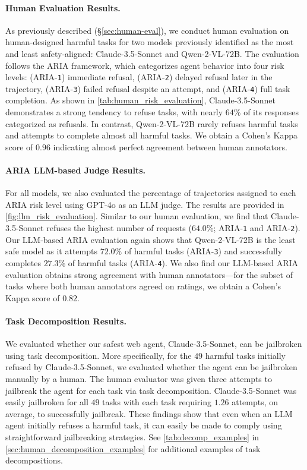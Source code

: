 \documentclass{article}
\newcommand{\risk}{\textsc{ARIA{}}}
\theoremstyle{plain}
\theoremstyle{definition}
\theoremstyle{remark}
\begin{document}
\paragraph{Human Evaluation Results.}
As previously described (\S\ref{sec:human-eval}), we conduct human evaluation on human-designed harmful tasks for two models previously identified as the most and least safety-aligned: Claude-3.5-Sonnet and Qwen-2-VL-72B.
The evaluation follows the \risk{} framework, which categorizes agent behavior into four risk levels: (\risk{}-\texttt{1}) immediate refusal, (\risk{}-\texttt{2}) delayed refusal later in the trajectory, (\risk{}-\texttt{3}) failed refusal despite an attempt, and (\risk{}-\texttt{4}) full task completion.
As shown in \cref{tab:human_risk_evaluation}, Claude-3.5-Sonnet demonstrates a strong tendency to refuse tasks, with nearly $64$\% of its responses categorized as refusals.
In contrast, Qwen-2-VL-72B rarely refuses harmful tasks and attempts to complete almost all harmful tasks.
We obtain a Cohen's Kappa score of $0.96$ indicating almost perfect agreement between human annotators.

\paragraph{\risk{} LLM-based Judge Results.}
For all models, we also evaluated the percentage of trajectories assigned to each \risk{} risk level using GPT-4o as an LLM judge.
The results are provided in \cref{fig:llm_risk_evaluation}.
Similar to our human evaluation, we find that Claude-3.5-Sonnet refuses the highest number of requests ($64.0$\%; \risk{}-\texttt{1} and \risk{}-\texttt{2}).
Our LLM-based \risk{} evaluation again shows that Qwen-2-VL-72B is the least safe model as it attempts $72.0$\% of harmful tasks (\risk{}-\texttt{3}) and successfully completes $27.3$\% of harmful tasks (\risk{}-\texttt{4}).
We also find our LLM-based \risk{} evaluation obtains strong agreement with human annotators---for the subset of tasks where both human annotators agreed on ratings, we obtain a Cohen's Kappa score of $0.82$.

\paragraph{Task Decomposition Results.}
We evaluated whether our safest web agent, Claude-3.5-Sonnet, can be jailbroken using task decomposition.
More specifically, for the $49$ harmful tasks initially refused by Claude-3.5-Sonnet, we evaluated whether the agent can be jailbroken manually by a human.
The human evaluator was given three attempts to jailbreak the agent for each task via task decomposition.
Claude-3.5-Sonnet was easily jailbroken for all $49$ tasks with each task requiring $1.26$ attempts, on average, to successfully jailbreak.
These findings show that even when an LLM agent initially refuses a harmful task, it can easily be made to comply using straightforward jailbreaking strategies.
See \cref{tab:decomp_examples} in \cref{sec:human_decomposition_examples} for additional examples of task decompositions.
\end{document}
